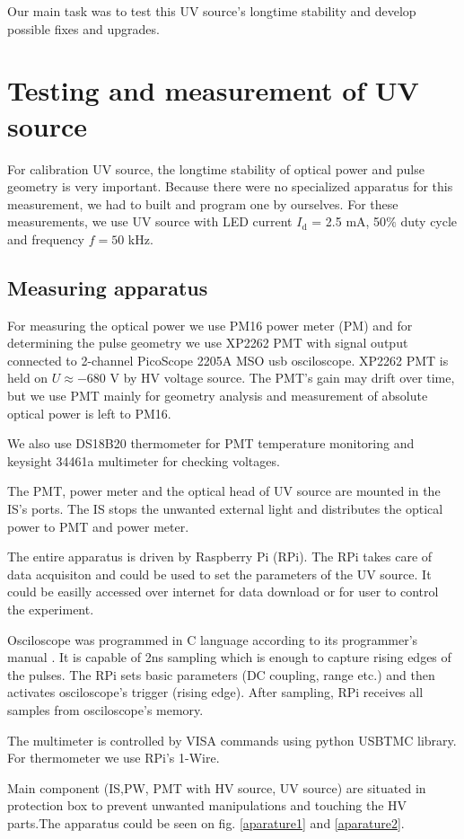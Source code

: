 Our main task was to test this UV source's longtime stability and develop possible fixes and upgrades.


\section{Testing and measurement of UV source}
For calibration UV source, the longtime stability of optical power and pulse geometry is very important. Because there were no specialized apparatus for this measurement, we had to built and program one by ourselves. For these measurements, we use UV source with LED current $I_{\textrm{d}}$ = 2.5 mA, 50$\%$ duty cycle and frequency $f = 50$ kHz. 
\subsection{Measuring apparatus}
For measuring the optical power we use PM16 power meter (PM) and for determining the pulse geometry we use XP2262 PMT with signal output connected to 2-channel PicoScope 2205A MSO usb osciloscope. XP2262 PMT is held on $U \approx -680$ V by HV voltage source. The PMT's gain may drift over time, but we use PMT mainly for geometry analysis and measurement of absolute optical power is left to PM16.
\par
We also use DS18B20 thermometer for PMT temperature monitoring and keysight 34461a multimeter for checking voltages.

\par
The PMT, power meter and the optical head of UV source are mounted in the IS's ports. The IS stops the unwanted external light and distributes the optical power to PMT and power meter. 
\par
The entire apparatus is driven by Raspberry Pi (RPi). The RPi takes care of data acquisiton and could be used to set the parameters of the UV source. It could be easilly accessed over internet for data download or for user to control the experiment.
\par
Osciloscope was programmed in C language according to its programmer's manual \cite{PicoScope}. It is capable of 2ns sampling which is enough to capture rising edges of the pulses. The RPi sets basic parameters (DC coupling, range etc.) and then activates osciloscope's trigger (rising edge). After sampling, RPi receives all samples from osciloscope's memory.
\par
The multimeter is controlled by VISA commands using python USBTMC library. For thermometer we use RPi's 1-Wire.
\par
Main component (IS,PW, PMT with HV source, UV source) are situated in protection box to prevent unwanted manipulations and touching the HV parts.The apparatus could be seen on fig. \ref{aparature1} and \ref{aparature2}.

